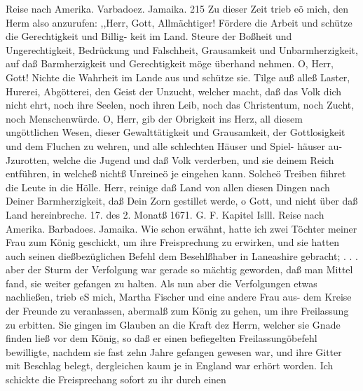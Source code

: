 Reise nach Amerika. Varbadoez. Jamaika. 215
Zu dieser Zeit trieb eö mich, den Herm also anzurufen:
,,Herr, Gott, Allmächtiger!
Fördere die Arbeit und schütze die Gerechtigkeit und Billig-
keit im Land. Steure der Boßheit und Ungerechtigkeit, Bedrückung
und Falschheit, Grausamkeit und Unbarmherzigkeit, auf daß
Barmherzigkeit und Gerechtigkeit möge überhand nehmen.
O, Herr, Gott! Nichte die Wahrheit im Lande aus und
schütze sie. Tilge auß alleß Laster, Hurerei, Abgötterei, den Geist
der Unzucht, welcher macht, daß das Volk dich nicht ehrt, noch
ihre Seelen, noch ihren Leib, noch das Christentum, noch Zucht,
noch Menschenwürde.
O, Herr, gib der Obrigkeit ins Herz, all diesem ungöttlichen
Wesen, dieser Gewalttätigkeit und Grausamkeit, der Gottlosigkeit und
dem Fluchen zu wehren, und alle schlechten Häuser und Spiel-
häuser au-Jzurotten, welche die Jugend und daß Volk verderben,
und sie deinem Reich entführen, in welcheß nichtß Unreineö je
eingehen kann. Solcheö Treiben fiihret die Leute in die Hölle.
Herr, reinige daß Land von allen diesen Dingen nach Deiner
Barmherzigkeit, daß Dein Zorn gestillet werde, o Gott, und nicht
über daß Land hereinbreche.
17. des 2. Monatß 1671. G. F.
Kapitel Islll.
Reise nach Amerika. Barbadoes. Jamaika.
Wie schon erwähnt, hatte ich zwei Töchter meiner Frau
zum König geschickt, um ihre Freisprechung zu erwirken, und sie
hatten auch seinen dießbezüglichen Befehl dem Besehlßhaber in
Laneashire gebracht; . . . aber der Sturm der Verfolgung war
gerade so mächtig geworden, daß man Mittel fand, sie weiter
gefangen zu halten. Als nun aber die Verfolgungen etwas
nachließen, trieb eS mich, Martha Fischer und eine andere Frau
aus- dem Kreise der Freunde zu veranlassen, abermalß zum König
zu gehen, um ihre Freilassung zu erbitten. Sie gingen im Glauben
an die Kraft dez Herrn, welcher sie Gnade finden ließ vor dem
König, so daß er einen befiegelten Freilassungöbefehl bewilligte,
nachdem sie fast zehn Jahre gefangen gewesen war, und ihre Gitter
mit Beschlag belegt, dergleichen kaum je in England war erhört
worden. Ich schickte die Freisprechang sofort zu ihr durch einen


